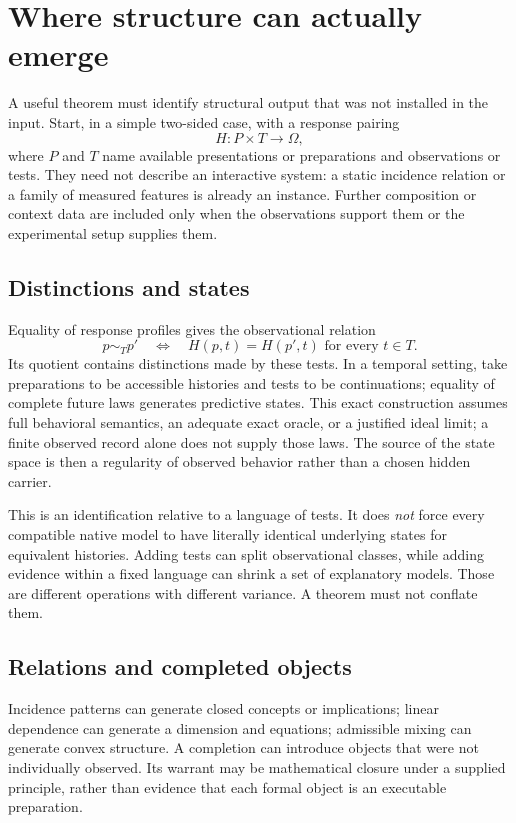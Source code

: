 \documentclass[11pt]{article}
\theoremstyle{remark}
\begin{document}
\section{Where structure can actually emerge}
\label{sec:emergence}

A useful theorem must identify structural output that was not installed in the input. Start, in a simple two-sided case, with a response pairing
\begin{equation}
 H:P\times T\longrightarrow\Omega,
 \label{eq:pairing}
\end{equation}
where $P$ and $T$ name available presentations or preparations and observations or tests. They need not describe an interactive system: a static incidence relation or a family of measured features is already an instance. Further composition or context data are included only when the observations support them or the experimental setup supplies them.

\subsection{Distinctions and states}

Equality of response profiles gives the observational relation
\[
 p\sim_Tp'\quad\Longleftrightarrow\quad H(p,t)=H(p',t)
 \text{ for every }t\in T.
\]
Its quotient contains distinctions made by these tests. In a temporal setting, take preparations to be accessible histories and tests to be continuations; equality of complete future laws generates predictive states. This exact construction assumes full behavioral semantics, an adequate exact oracle, or a justified ideal limit; a finite observed record alone does not supply those laws. The source of the state space is then a regularity of observed behavior rather than a chosen hidden carrier.

This is an identification relative to a language of tests. It does \emph{not} force every compatible native model to have literally identical underlying states for equivalent histories. Adding tests can split observational classes, while adding evidence within a fixed language can shrink a set of explanatory models. Those are different operations with different variance. A theorem must not conflate them.

\subsection{Relations and completed objects}

Incidence patterns can generate closed concepts or implications; linear dependence can generate a dimension and equations; admissible mixing can generate convex structure. A completion can introduce objects that were not individually observed. Its warrant may be mathematical closure under a supplied principle, rather than evidence that each formal object is an executable preparation.
\end{document}
